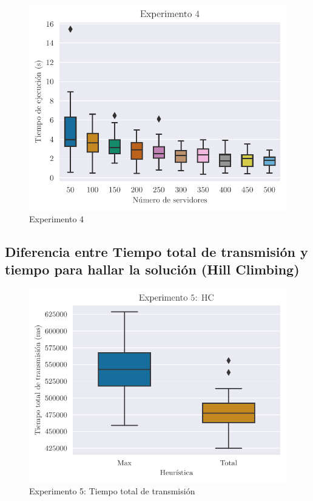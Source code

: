 \begin{figure}[H]
    \centering
    \includegraphics{include/plots/ex4_s_time_bplot_cut.pdf}
    \caption{Experimento 4}%
    \label{fig:ex4s}
\end{figure}

\subsection{Diferencia entre Tiempo total de transmisión y tiempo para hallar la solución (Hill Climbing)}

\begin{figure}[H]
    \centering
    \includegraphics{include/plots/ex5_ttt_bplot.pdf}
    \caption{Experimento 5: Tiempo total de transmisión}%
    \label{fig:ex5ttt}
\end{figure}

